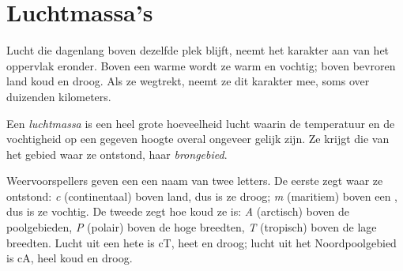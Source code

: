 \section{Luchtmassa's}

Lucht die dagenlang boven dezelfde plek blijft, neemt het karakter aan van
het oppervlak eronder. Boven een warme  wordt ze warm en vochtig;
boven bevroren land koud en droog. Als ze wegtrekt, neemt ze dit karakter
mee, soms over duizenden kilometers.

\begin{definition}[Luchtmassa]\label{def:g8:fronts-and-weather-maps:air-mass}
Een \emph{luchtmassa} is een heel grote hoeveelheid lucht
waarin de temperatuur en de vochtigheid op een gegeven hoogte overal
ongeveer gelijk zijn. Ze krijgt die van het gebied waar ze ontstond, haar
\emph{brongebied}.
\end{definition}

Weervoorspellers geven een  een naam van twee letters. De eerste
zegt waar ze ontstond: \emph{c} (continentaal) boven land, dus is ze droog;
\emph{m} (maritiem) boven een , dus is ze vochtig. De tweede zegt hoe
koud ze is: \emph{A} (arctisch) boven de poolgebieden, \emph{P} (polair)
boven de hoge breedten, \emph{T} (tropisch) boven de lage breedten. Lucht
uit een hete  is cT, heet en droog; lucht uit het Noordpoolgebied
is cA, heel koud en droog.

